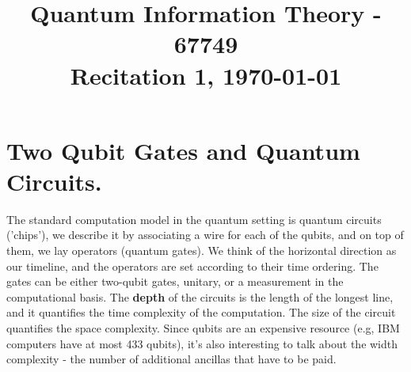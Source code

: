 \documentclass[12pt,a4paper]{article}
\title{ \begin{framed} Quantum Information Theory - 67749 \\ 
Recitation 1, \today \end{framed}  }
\date{\vspace{-5ex}}
\begin{document}
\maketitle{ }    


\newcommand{\CCZ}{\textbf{CCZ}}
\newcommand{\CCX}{\textbf{CCX}}


\setcounter{enumcirc}{1} 


\newcommand{\advanceday}[1][21]{%
\begingroup
\AdvanceDate[#1]%
\today%
\endgroup
}%


\newcommand{\subqCircEx}[2]{\begin{subfigure}[t]{0.5\textwidth}
        \stepcounter{enumcirc} \caption*{ (\alph{enumcirc}) #1} \centering 
        #2
    \end{subfigure}
}

\newcommand{\qCircEx}[4]{\begin{figure*}[h!]
    \centering
    \subqCircEx{#1}{#2}
    ~ 
    \subqCircEx{#3}{#4}
\end{figure*}
}

\newcommand{\qCircExfullline}[2]{\begin{figure*}[h!]
    \stepcounter{enumcirc} \caption*{ (\alph{enumcirc}) #1}
        \centering 
        #2
\end{figure*}
}




\section{Two Qubit Gates and Quantum Circuits.}
The standard computation model in the quantum setting is quantum circuits ('chips'), we describe it by associating a wire for each of the qubits, and on top of them, we lay operators (quantum gates). We think of the horizontal direction as our timeline, and the operators are set according to their time ordering. The gates can be either two-qubit gates, unitary, or a measurement in the computational basis. The \textbf{depth} of the circuits is the length of the longest line, and it quantifies the time complexity of the computation. The size of the circuit quantifies the space complexity. Since qubits are an expensive resource (e.g, IBM computers have at most 433 qubits), it's also interesting to talk about the width complexity - the number of additional ancillas that have to be paid. %
\end{document}
